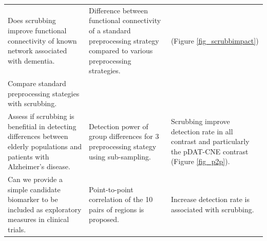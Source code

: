 \documentclass[authoryear]{elsarticle}
\begin{document}
\begin{landscape}
\begin{table}[!ht]
\begin{center}
\begin{tabular}{p{6cm}p{6cm}p{10cm}}
   \\Does scrubbing improve functional connectivity of known network associated with dementia. & Difference between functional connectivity of a standard preprocessing strategy compared to various preprocessing strategies. &  (Figure \ref{fig_scrubbimpact})
   
   \\Compare standard preprocessing stategies with scrubbing. &
   
   \\Assess if scrubbing is benefitial in detecting differences between elderly populations and patients with Alzheimer's disease. & Detection power of group differences for 3 preprocessing stategy using sub-sampling. & Scrubbing improve detection rate in all contrast and particularly the pDAT-CNE contrast (Figure \ref{fig_p2p}).
   
   \\ Can we provide a simple candidate biomarker to be included as exploratory measures in clinical trials. & Point-to-point correlation of the 10 pairs of regions is proposed. & Increase detection rate is associated with scrubbing.
  
  
    

\end{tabular}
\end{center}
\end{table}
\end{landscape}
\end{document}
